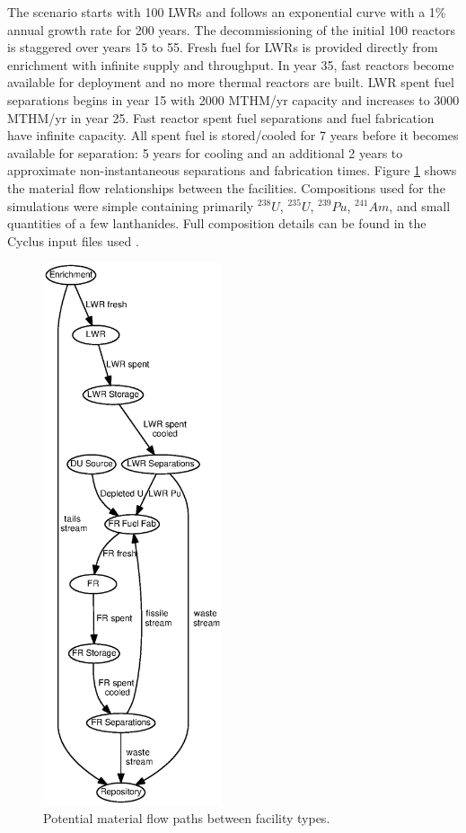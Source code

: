 \documentclass{style}
\begin{document}
The scenario starts with 100 LWRs and follows an exponential curve with a 1\%
annual growth rate for 200 years.  The decommissioning of the initial 100
reactors is staggered over years 15 to 55.  Fresh fuel for LWRs is provided directly from enrichment with infinite supply and throughput. In year 35, fast reactors become available for
deployment and no more thermal reactors are built.  LWR spent fuel separations
begins in year 15 with 2000 MTHM/yr capacity and increases to 3000 MTHM/yr in
year 25.  Fast reactor spent fuel separations and fuel fabrication have
infinite capacity.  All spent fuel is stored/cooled for 7 years before it becomes
available for separation: 5 years for cooling and an additional 2 years to approximate non-instantaneous separations and fabrication times. Figure \ref{fig:flow} shows the material flow
relationships between the facilities.  Compositions used for the simulations
were simple containing primarily $^{238}U$, $^{235}U$, $^{239}Pu$, $^{241}Am$,
and small quantities of a few lanthanides.  Full composition details can be
found in the Cyclus input files used \cite{Carlsen2015}.

\begin{figure}[!h]
    \centering
    \includegraphics[width=0.47\textwidth]{exp2/flow.eps}
    \caption[Material flow paths]{Potential material flow paths between facility types.}
    \label{fig:flow}
\end{figure}
\end{document}
